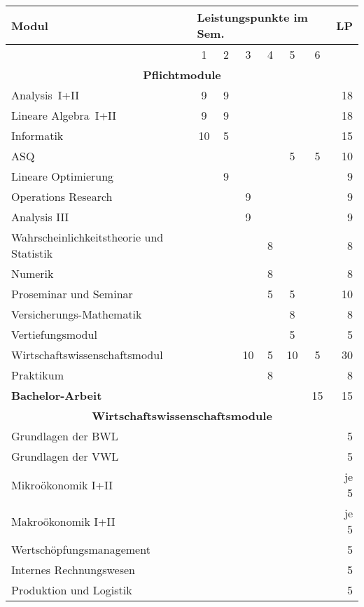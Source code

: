 \begin{table}[tbp]
    \begin{small}
    \begin{tabularx}{\textwidth}{|X||c|c|c|c|c|c||r|}\hline
        \textbf{Modul}&\multicolumn{6}{l||}{\textbf{Leistungspunkte im Sem.}}&\textbf{LP}\\\hline
        &1&2&3&4&5&6&\\\hline\hline
        \multicolumn{8}{|c|}{\textbf{Pflichtmodule}}\\\hline
        Analysis~I+II&9&9&&&&&18\\\hline
        Lineare Algebra~I+II&9&9&&&&&18\\\hline
        Informatik&10&5&&&&&15\\\hline
        ASQ&&&&&5&5&10\\\hline
        Lineare Optimierung&&9&&&&&9\\\hline
        Operations Research&&&9&&&&9\\\hline
        Analysis III&&&9&&&&9\\\hline
        Wahrscheinlichkeitstheorie und Statistik&&&&8&&&8\\\hline
        Numerik&&&&8&&&8\\\hline
        Proseminar und Seminar&&&&5&5&&10\\\hline
        Versicherungs-Mathematik&&&&&8&&8\\\hline
        Vertiefungsmodul&&&&&5&&5\\\hline
        Wirtschaftswissenschaftsmodul&&&10&5&10&5&30\\\hline
        Praktikum&&&&8&&&8\\\hline\hline
        \textbf{Bachelor-Arbeit}&&&&&&15&15\\\hline\hline
        \multicolumn{8}{|c|}{\textbf{Wirtschaftswissenschaftsmodule}}\\\hline
        \multicolumn{7}{|X||}{Grundlagen der BWL}&5\\\hline
        \multicolumn{7}{|X||}{Grundlagen der VWL}&5\\\hline
        \multicolumn{7}{|X||}{Mikroökonomik I+II}&je 5\\\hline
        \multicolumn{7}{|X||}{Makroökonomik I+II}&je 5\\\hline
        \multicolumn{7}{|X||}{Wertschöpfungsmanagement}&5\\\hline
        \multicolumn{7}{|X||}{Internes Rechnungswesen}&5\\\hline
        \multicolumn{7}{|X||}{Produktion und Logistik}&5\\\hline

\end{tabularx}
\end{small}
\end{table}
